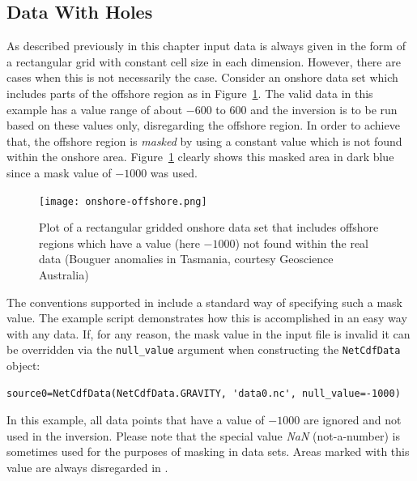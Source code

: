 \subsection{Data With Holes}\label{SEC:P1:GRAV:REMARK:DATAHOLES}
As described previously in this chapter input data is always given in the form
of a rectangular grid with constant cell size in each dimension.
However, there are cases when this is not necessarily the case.
Consider an onshore data set which includes parts of the offshore region as in
Figure~\ref{FIG:P1:GRAV:onshoreoffshore}.
The valid data in this example has a value range of about $-600$ to $600$ and
the inversion is to be run based on these values only, disregarding the
offshore region.
In order to achieve that, the offshore region is \emph{masked} by using a
constant value which is not found within the onshore area.
Figure~\ref{FIG:P1:GRAV:onshoreoffshore} clearly shows this masked area in
dark blue since a mask value of $-1000$ was used.

\begin{figure}[ht]
    \centering
    \texttt{[image: onshore-offshore.png]}
    \caption{Plot of a rectangular gridded onshore data set that includes
    offshore regions which have a value (here $-1000$) not found within the
    real data (Bouguer anomalies in Tasmania, courtesy Geoscience Australia)}
    \label{FIG:P1:GRAV:onshoreoffshore}
\end{figure}

The \netcdf conventions supported in \downunder include a standard way of
specifying such a mask value.
The example script  demonstrates how this is
accomplished in an easy way with any data.
If, for any reason, the mask value in the input file is invalid it can be
overridden via the \verb|null_value| argument when constructing the
\verb|NetCdfData| object:
\begin{verbatim}
source0=NetCdfData(NetCdfData.GRAVITY, 'data0.nc', null_value=-1000)
\end{verbatim}
In this example, all data points that have a value of $-1000$ are ignored and
not used in the inversion.
Please note that the special value \emph{NaN} (not-a-number) is sometimes used
for the purposes of masking in data sets.
Areas marked with this value are always disregarded in \downunder.


